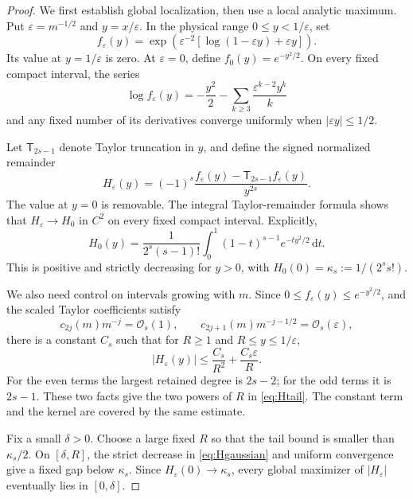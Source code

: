 \documentclass[11pt,a4paper]{article}
\theoremstyle{definition}
\newcommand{\dd}{\,\mathrm d}
\newcommand{\bigO}{\mathcal O}
\begin{document}
\begin{proof}
We first establish global localization, then use a local analytic maximum.
Put $\varepsilon=m^{-1/2}$ and $y=x/\varepsilon$. In the physical
range $0\le y<1/\varepsilon$, set
\begin{equation}\label{eq:fscaled}
 f_\varepsilon(y)=
 \exp\left(\varepsilon^{-2}
          [\log(1-\varepsilon y)+\varepsilon y]\right).
\end{equation}
Its value at $y=1/\varepsilon$ is zero. At $\varepsilon=0$, define
$f_0(y)=e^{-y^2/2}$. On every fixed compact interval, the series
\begin{equation}\label{eq:scaledlog}
 \log f_\varepsilon(y)
   =-\frac{y^2}{2}-\sum_{k\ge3}\frac{\varepsilon^{k-2}y^k}{k}
\end{equation}
and any fixed number of its derivatives converge uniformly when
$|\varepsilon y|\le1/2$.

Let $\mathsf T_{2s-1}$ denote Taylor truncation in $y$, and define the
signed normalized remainder
\begin{equation}\label{eq:Hscaled}
 H_\varepsilon(y)=(-1)^s
 \frac{f_\varepsilon(y)-\mathsf T_{2s-1}f_\varepsilon(y)}{y^{2s}}.
\end{equation}
The value at $y=0$ is removable. The integral Taylor-remainder formula
shows that $H_\varepsilon\to H_0$ in $C^2$ on every fixed compact
interval. Explicitly,
\begin{equation}\label{eq:Hgaussian}
 H_0(y)=\frac1{2^s(s-1)!}
    \int_0^1(1-t)^{s-1}e^{-ty^2/2}\dd t.
\end{equation}
This is positive and strictly decreasing for $y>0$, with
$H_0(0)=\kappa_s:=1/(2^ss!)$.

We also need control on intervals growing with $m$. Since
$0\le f_\varepsilon(y)\le e^{-y^2/2}$, and the scaled Taylor
coefficients satisfy
\[
 c_{2j}(m)m^{-j}=\bigO_s(1),\qquad
 c_{2j+1}(m)m^{-j-1/2}=\bigO_s(\varepsilon),
\]
there is a constant $C_s$ such that for $R\ge1$ and
$R\le y\le1/\varepsilon$,
\begin{equation}\label{eq:Htail}
 |H_\varepsilon(y)|\le\frac{C_s}{R^2}
                                  +\frac{C_s\varepsilon}{R}.
\end{equation}
For the even terms the largest retained degree is $2s-2$; for the odd
terms it is $2s-1$. These two facts give the two powers of $R$ in
\eqref{eq:Htail}. The constant term and the kernel are covered by the
same estimate.

Fix a small $\delta>0$. Choose a large fixed $R$ so that the tail bound
is smaller than $\kappa_s/2$. On $[\delta,R]$, the strict decrease in
\eqref{eq:Hgaussian} and uniform convergence give a fixed gap below
$\kappa_s$. Since $H_\varepsilon(0)\to\kappa_s$, every global
maximizer of $|H_\varepsilon|$ eventually lies in $[0,\delta]$.


\end{proof}
\end{document}
